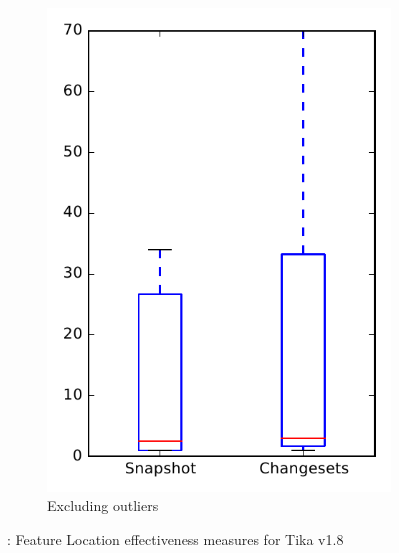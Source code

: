 \begin{figure}
\begin{subfigure}{.4\textwidth}
        \includegraphics[height=0.4\textheight]{figures/flt/rq1_tika_no_outlier}
        \caption{Excluding outliers}\label{fig:flt:rq1:tika_no_outlier}
    \end{subfigure}
\caption{\fone: Feature Location effectiveness measures for Tika v1.8}
\label{fig:flt:rq1:tika}
\end{figure}
